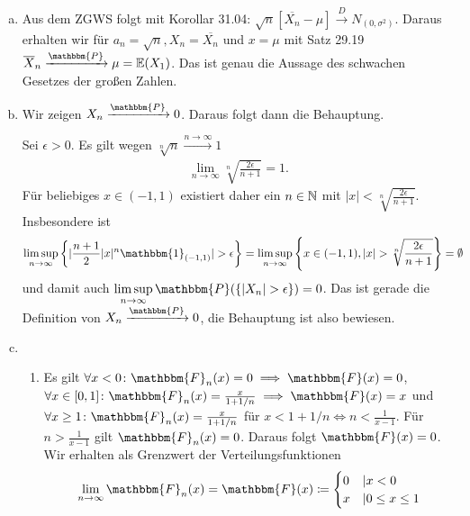 \documentclass[uebung]{lecture}
\newcommand{\E}{\mathbb{E}}
\newcommand{\F}{\mathbbm{F}}
\begin{document}
\begin{aufgabe}[]
    \begin{enumerate}[(a)]
        \item Aus dem ZGWS folgt mit Korollar 31.04: $\sqrt{n}[\overline{X_n}-\mu] \xrightarrow{D} N_{(0,\sigma^2)}$.
        Daraus erhalten wir für $a_n = \sqrt{n}, X_n = \overline{X_n}$ und $x = \mu$ mit Satz 29.19 
        $\overline{X}_n \xrightarrow{\mathbbm{P}} \mu = \E(X_1)$. Das ist genau die Aussage des schwachen Gesetzes
        der großen Zahlen.
        \item Wir zeigen $X_n \xrightarrow{\mathbbm{P}} 0$. Daraus folgt dann die Behauptung.
        
        Sei $\epsilon > 0$. 
        Es gilt wegen $\sqrt[n]{n} \xrightarrow{n \to \infty} 1$
        \begin{align*}
            \lim\limits_{n \to \infty} \sqrt[n]{\frac{2\epsilon}{n+1}} = 1.
        \end{align*}
        Für beliebiges $x \in (-1, 1)$ existiert daher ein $n\in \mathbb{N}$ mit $|x| < \sqrt[n]{\frac{2\epsilon}{n+1}}$.
        Insbesondere ist 
        \begin{align*}
            \limsup\limits_{n \to \infty} \left\{|\frac{n+1}{2} |x|^n \mathbbm{1}_{(-1,1)}| > \epsilon\right\}
            &= \limsup\limits_{n \to \infty} \left\{x \in (-1, 1), |x| > \sqrt[n]{\frac{2\epsilon}{n+1}}\right\}= \emptyset
        \end{align*}
        und damit auch $\limsup\limits_{n \to \infty} \mathbbm{P}(\{|X_n| > \epsilon\}) = 0$.
        Das ist gerade die Definition von $X_n \xrightarrow{\mathbbm{P}} 0$, die Behauptung ist also bewiesen.
        \item \begin{enumerate}
            \item Es gilt $\forall x < 0\colon \F_n(x) = 0 \implies \F(x) = 0$,
            $\forall x \in [0,1]\colon \F_n(x) = \frac{x}{1 + 1/n} \implies \F(x) = x$ und
            $\forall x \geq 1\colon \F_n(x) = \frac{x}{1+1/n}$ für $x < 1+ 1/n \Leftrightarrow n < \frac{1}{x-1}$. 
            Für $n > \frac{1}{x-1}$ gilt $\F_n(x) = 0$. Daraus folgt $\F(x) = 0$.
            Wir erhalten als Grenzwert der Verteilungsfunktionen 
            \begin{align*}
                \lim\limits_{n \to \infty} \F_n(x) = \F(x) \coloneqq \begin{cases}
                    0 &| x < 0\\
                    x &| 0 \leq x \leq 1\\

\end{cases}
\end{align*}
\end{enumerate}
\end{enumerate}
\end{aufgabe}
\end{document}
